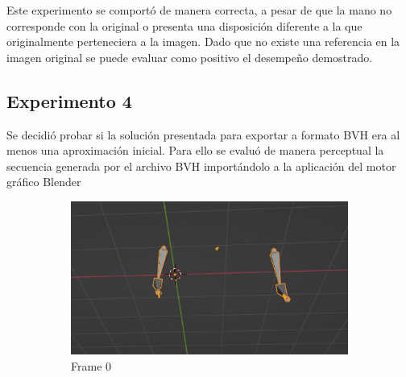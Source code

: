 Este experimento se comportó de manera correcta, a pesar de que la mano no corresponde con la original o presenta una disposición diferente a la que originalmente perteneciera a la imagen. Dado que no existe una referencia en la imagen original se puede evaluar como positivo el desempeño demostrado.
\subsection{Experimento 4}
Se decidió probar si la solución presentada para exportar a formato BVH era al menos una aproximación inicial. Para ello se evaluó de manera perceptual la secuencia generada por el archivo BVH importándolo a la aplicación del motor gráfico Blender




\begin{figure}[t]
\centering
		\begin{subfigure}[t]{0.3\textwidth}
		\centering
		\includegraphics[align=t,width=0.9\linewidth, height =0.9\linewidth]{Graphics/blender_bvh_1.png}
		\caption{Frame 0}
		\label{f:bframe0}
	\end{subfigure}
		\begin{subfigure}[t]{0.3\textwidth}
		\centering

\end{subfigure}
\end{figure}
